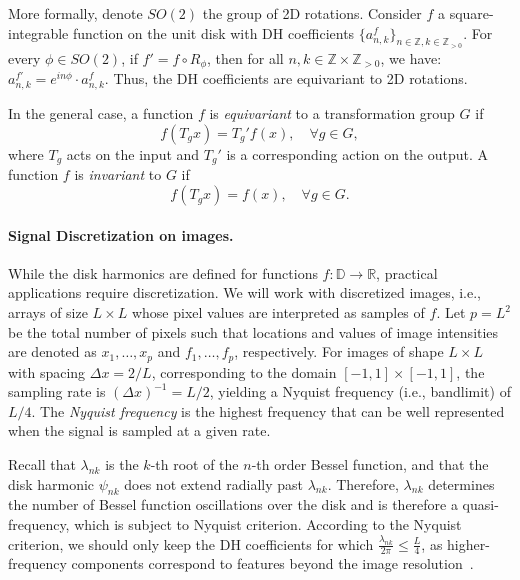 \begin{proposition}[Equivariance]
More formally, denote $SO(2)$ the group of 2D rotations. Consider $f$ a square-integrable function on the unit disk with DH coefficients $\{a^f_{n, k}\}_{n\in \mathbb{Z}, k\in \mathbb{Z}_{>0}}$. For every $\phi \in SO(2)$, if $f' = f \circ R_\phi$, then for all $n, k \in \mathbb{Z} \times \mathbb{Z}_{>0}$, we have: $a^{f'}_{n, k} = e^{in\phi}\cdot a^{f}_{n, k}.$ Thus, the DH coefficients are equivariant to 2D rotations.
\end{proposition}

In the general case, a function $f$ is \textit{equivariant} to a transformation group $G$ if
\[
f(T_g x) = T_g' f(x), \quad \forall g \in G,
\]
where $T_g$ acts on the input and $T_g'$ is a corresponding action on the output. A function $f$ is \textit{invariant} to $G$ if
\[
f(T_g x) = f(x), \quad \forall g \in G.
\]
\paragraph{Signal Discretization on images.} While the disk harmonics are defined for functions $f : \mathbb{D} \to \mathbb{R}$, practical applications require discretization. We will work with discretized images, i.e., arrays of size $L \times L$ whose pixel values are interpreted as samples of $f$.
Let $p = L^2$ be the total number of pixels such that locations and values of image intensities are denoted as $x_1, \dots, x_p$ and $f_1, \dots, f_p$, respectively. For images of shape \( L \times L \) with spacing \( \Delta x = 2/L \), corresponding to the domain \( [-1,1] \times [-1,1] \), the sampling rate is \( (\Delta x)^{-1} = L/2 \), yielding a Nyquist frequency (i.e., bandlimit) of \( L/4 \). The \textit{Nyquist frequency} is the highest frequency that can be well represented when the signal is sampled at a given rate.

Recall that $\lambda_{nk}$ is the $k$-th root of the $n$-th order Bessel function, and that the disk harmonic $\psi_{nk}$ does not extend radially past $\lambda_{nk}$. Therefore, $\lambda_{nk}$ determines  the number of Bessel function oscillations over the disk and is therefore a quasi-frequency, which is subject to Nyquist criterion. According to the Nyquist criterion, we should only keep the DH coefficients for which $\frac{\lambda_{nk}}{2\pi} \leq \frac{L}{4}$, as higher-frequency components correspond to features beyond the image resolution~\citep{zhao2013fourier}.

